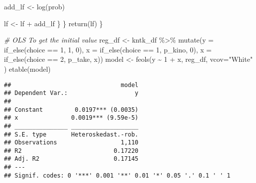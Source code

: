 \documentclass[
]{article}
\newenvironment{Shaded}{\begin{snugshade}}{\end{snugshade}}
\newcommand{\AttributeTok}[1]{\textcolor[rgb]{0.77,0.63,0.00}{#1}}
\newcommand{\CommentTok}[1]{\textcolor[rgb]{0.56,0.35,0.01}{\textit{#1}}}
\newcommand{\DecValTok}[1]{\textcolor[rgb]{0.00,0.00,0.81}{#1}}
\newcommand{\FunctionTok}[1]{\textcolor[rgb]{0.00,0.00,0.00}{#1}}
\newcommand{\NormalTok}[1]{#1}
\newcommand{\OtherTok}[1]{\textcolor[rgb]{0.56,0.35,0.01}{#1}}
\newcommand{\SpecialCharTok}[1]{\textcolor[rgb]{0.00,0.00,0.00}{#1}}
\newcommand{\StringTok}[1]{\textcolor[rgb]{0.31,0.60,0.02}{#1}}
\begin{document}
\begin{Shaded}
\begin{Highlighting}[]
\NormalTok{      add\_lf }\OtherTok{\textless{}{-}} \FunctionTok{log}\NormalTok{(prob)}
      
\NormalTok{      lf }\OtherTok{\textless{}{-}}\NormalTok{ lf }\SpecialCharTok{+}\NormalTok{ add\_lf}
\NormalTok{    \}}
\NormalTok{  \}}
  \FunctionTok{return}\NormalTok{(lf)}
\NormalTok{\} }

\CommentTok{\# OLS To get the initial value}
\NormalTok{reg\_df }\OtherTok{\textless{}{-}}\NormalTok{ kntk\_df }\SpecialCharTok{\%\textgreater{}\%} 
  \FunctionTok{mutate}\NormalTok{(}\AttributeTok{y =} \FunctionTok{if\_else}\NormalTok{(choice }\SpecialCharTok{==} \DecValTok{1}\NormalTok{, }\DecValTok{1}\NormalTok{, }\DecValTok{0}\NormalTok{), }
         \AttributeTok{x =} \FunctionTok{if\_else}\NormalTok{(choice }\SpecialCharTok{==} \DecValTok{1}\NormalTok{, p\_kino, }\DecValTok{0}\NormalTok{),}
         \AttributeTok{x =} \FunctionTok{if\_else}\NormalTok{(choice }\SpecialCharTok{==} \DecValTok{2}\NormalTok{, p\_take, x))}
\NormalTok{model }\OtherTok{\textless{}{-}} \FunctionTok{feols}\NormalTok{(y }\SpecialCharTok{\textasciitilde{}}  \DecValTok{1}   \SpecialCharTok{+}\NormalTok{ x, }
\NormalTok{               reg\_df, }\AttributeTok{vcov=}\StringTok{"White"}
\NormalTok{)}
\FunctionTok{etable}\NormalTok{(model)}
\end{Highlighting}
\end{Shaded}

\begin{verbatim}
##                               model
## Dependent Var.:                   y
##                                    
## Constant         0.0197*** (0.0035)
## x               0.0019*** (9.59e-5)
## _______________ ___________________
## S.E. type       Heteroskedast.-rob.
## Observations                  1,110
## R2                          0.17220
## Adj. R2                     0.17145
## ---
## Signif. codes: 0 '***' 0.001 '**' 0.01 '*' 0.05 '.' 0.1 ' ' 1
\end{verbatim}
\end{document}
